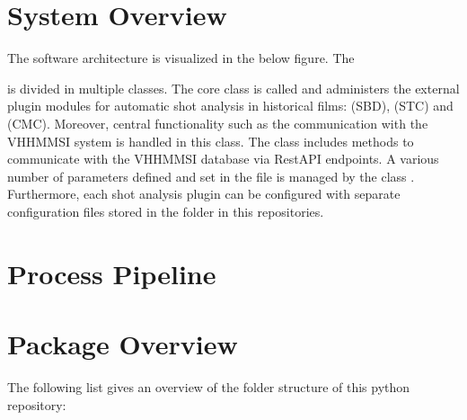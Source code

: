 \documentclass[letterpaper,10pt,english,openany,oneside]{sphinxmanual}
\begin{document}
\chapter{System Overview}
\label{\detokenize{index:system-overview}}
The software architecture is visualized in the below figure. The  %
\begin{footnote}[2]\sphinxAtStartFootnote
{}
%
\end{footnote} is divided in multiple classes. The core
class is called  and administers the external plugin modules for automatic shot analysis in historical
films:  \sphinxfootnotemark[3] (SBD),  \sphinxfootnotemark[4] (STC) and  \sphinxfootnotemark[5] (CMC). Moreover, central functionality such as the communication
with the VHH\sphinxhyphen{}MMSI system is handled in this class. The class  includes methods to communicate with the
VHH\sphinxhyphen{}MMSI database via RestAPI endpoints. A various number of parameters defined and set in the 
file is managed by the class . Furthermore, each shot analysis plugin can be configured with separate
configuration files stored in the  folder in this repositories.

\begin{figure}[htbp]
\centering

\noindent{}
\end{figure}


\chapter{Process Pipeline}
\label{\detokenize{index:process-pipeline}}
\begin{figure}[htbp]
\centering

\noindent{}
\end{figure}


\chapter{Package Overview}
\label{\detokenize{index:package-overview}}
The following list gives an overview of the folder structure of this python repository:
\end{document}
